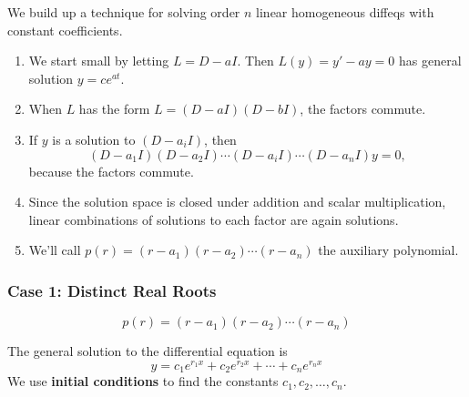 We build up a technique for solving order $n$ linear homogeneous diffeqs with constant coefficients.
\begin{enumerate}
    \item We start small by letting $L = D - aI$. Then $L(y) = y' - ay = 0$ has general solution $y = ce^{at}$.
    \item When $L$ has the form $L = (D - aI)(D - bI)$, the factors commute.
    \item If $y$ is a solution to $(D - a_iI)$, then
    \[
        (D - a_1I)(D - a_2I) \cdots (D - a_iI) \cdots (D - a_nI)y = 0,
    \]
    because the factors commute.
    \item Since the solution space is closed under addition and scalar multiplication, linear combinations of solutions to each factor are again solutions.
    \item We’ll call $p(r) = (r - a_1)(r - a_2) \cdots (r - a_n)$ the auxiliary polynomial.
\end{enumerate}



\subsubsection{Case 1: Distinct Real Roots}
\[
    p(r) = (r - a_1)(r - a_2) \cdots (r - a_n)
\]


The general solution to the differential equation is
\[
    y = c_1e^{r_1x} + c_2e^{r_2x} + \cdots + c_ne^{r_nx}
\]
We use \textbf{initial conditions} to find the constants $c_1, c_2, \ldots, c_n$.

